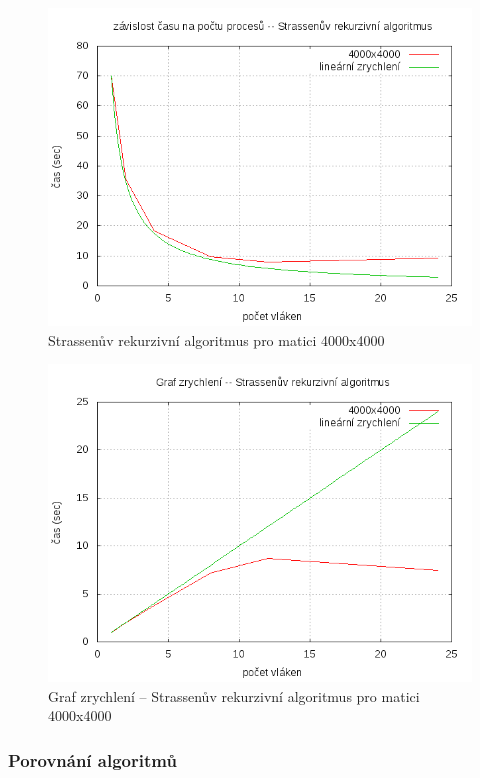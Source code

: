 \documentclass[12pt,a4paper]{article}
\begin{document}
\pagebreak
\begin{figure}[h]
\includegraphics[width=\textwidth]{graph/strassen-4000.png}
\caption{Strassenův rekurzivní algoritmus pro matici 4000x4000}
\label{data4}
\end{figure}


\pagebreak
\begin{figure}[h]
\includegraphics[width=\textwidth]{graph/strassen-acc.png}
\caption{Graf zrychlení -- Strassenův rekurzivní algoritmus pro matici 4000x4000}
\label{data4}
\end{figure}



\pagebreak
\subsubsection{Porovnání algoritmů}
\end{document}

